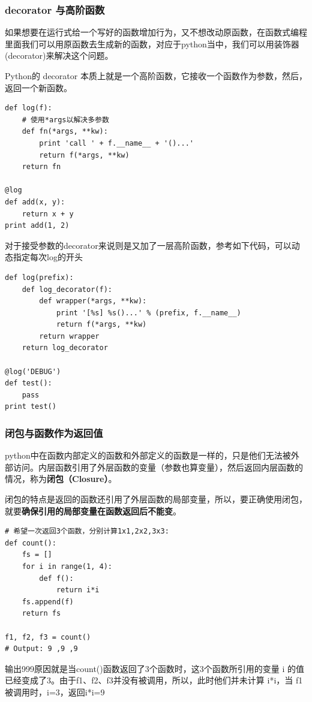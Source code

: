 \documentclass{article}
\begin{document}
		\subsubsection{decorator 与高阶函数}
		如果想要在运行式给一个写好的函数增加行为，又不想改动原函数，在函数式编程里面我们可以用原函数去生成新的函数，对应于python当中，我们可以用装饰器(decorator)来解决这个问题。
		
		Python的 decorator 本质上就是一个高阶函数，它接收一个函数作为参数，然后，返回一个新函数。
		
		\lstset{language=python}
		\begin{lstlisting}
def log(f):
	# 使用*args以解决多参数
	def fn(*args, **kw):
		print 'call ' + f.__name__ + '()...'
		return f(*args, **kw)
	return fn

@log
def add(x, y):
	return x + y
print add(1, 2)
		\end{lstlisting}
		对于接受参数的decorator来说则是又加了一层高阶函数，参考如下代码，可以动态指定每次log的开头
		
		\lstset{language=python}
		\begin{lstlisting}
def log(prefix):
	def log_decorator(f):
		def wrapper(*args, **kw):
			print '[%s] %s()...' % (prefix, f.__name__)
			return f(*args, **kw)
		return wrapper
	return log_decorator

@log('DEBUG')
def test():
	pass
print test()
		\end{lstlisting}
		
		\subsubsection{闭包与函数作为返回值}
		python中在函数内部定义的函数和外部定义的函数是一样的，只是他们无法被外部访问。内层函数引用了外层函数的变量（参数也算变量），然后返回内层函数的情况，称为\textbf{闭包（Closure）}。
		
		闭包的特点是返回的函数还引用了外层函数的局部变量，所以，要正确使用闭包，就要\textbf{确保引用的局部变量在函数返回后不能变}。
		
\lstset{language=python}
\begin{lstlisting}
# 希望一次返回3个函数，分别计算1x1,2x2,3x3:
def count():
	fs = []
	for i in range(1, 4):
		def f():	
			return i*i		
	fs.append(f)
	return fs

f1, f2, f3 = count()
# Output: 9 ,9 ,9
\end{lstlisting}
		输出999原因就是当count()函数返回了3个函数时，这3个函数所引用的变量 i 的值已经变成了3。由于f1、f2、f3并没有被调用，所以，此时他们并未计算 i*i，当 f1 被调用时，i=3，返回i*i=9
\end{document}
